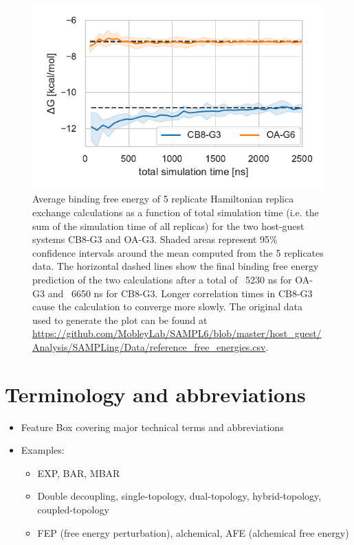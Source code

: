 \documentclass[9pt,bestpractices]{livecoms}
\begin{document}
\begin{figure}
    \includegraphics[width=0.95\linewidth]{figures/fig9_convergence/Figure.pdf}
    \caption{Average binding free energy of 5 replicate Hamiltonian replica exchange calculations as a function of total simulation time (i.e. the sum of the simulation time of all replicas) for the two host-guest systems CB8-G3 and OA-G3. Shaded areas represent 95\% confidence intervals around the mean computed from the 5 replicates data. The horizontal dashed lines show the final binding free energy prediction of the two calculations after a total of ~5230 ns for OA-G3 and ~6650 ns for CB8-G3. Longer correlation times in CB8-G3 cause the calculation to converge more slowly. The original data used to generate the plot can be found at \url{https://github.com/MobleyLab/SAMPL6/blob/master/host_guest/Analysis/SAMPLing/Data/reference_free_energies.csv}.
}
    \label{fig:freeenergytrajectories}
\end{figure}

\section{Terminology and abbreviations}
\label{sec:tem-abbrev}
\begin{itemize}
\item Feature Box covering major technical terms and abbreviations
\item Examples:
\begin{itemize}
\item EXP, BAR, MBAR
\item Double decoupling, single-topology, dual-topology, hybrid-topology, coupled-topology
\item FEP (free energy perturbation), alchemical, AFE (alchemical free energy)
\end{itemize}
\end{itemize}
\end{document}
